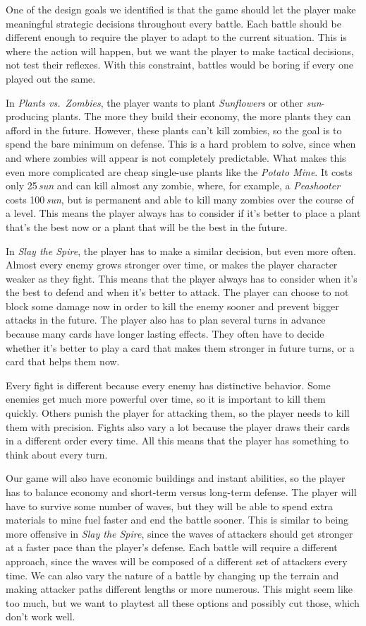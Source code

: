 One of the design goals we identified is that the game should let the player make meaningful strategic decisions throughout every battle.
Each battle should be different enough to require the player to adapt to the current situation.
This is where the action will happen, but we want the player to make tactical decisions, not test their reflexes.
With this constraint, battles would be boring if every one played out the same.

In \emph{Plants vs.\ Zombies}, the player wants to plant \emph{Sunflowers} or other \emph{sun}-producing plants.
The more they build their economy, the more plants they can afford in the future.
However, these plants can't kill zombies, so the goal is to spend the bare minimum on defense.
This is a hard problem to solve, since when and where zombies will appear is not completely predictable.
What makes this even more complicated are cheap single-use plants like the \emph{Potato Mine}.
It costs only 25\,\emph{sun} and can kill almost any zombie, where, for example, a \emph{Peashooter} costs 100\,\emph{sun}, but is permanent and able to kill many zombies over the course of a level.
This means the player always has to consider if it's better to place a plant that's the best now or a plant that will be the best in the future.

In \emph{Slay the Spire}, the player has to make a similar decision, but even more often.
Almost every enemy grows stronger over time, or makes the player character weaker as they fight.
This means that the player always has to consider when it's the best to defend and when it's better to attack.
The player can choose to not block some damage now in order to kill the enemy sooner and prevent bigger attacks in the future.
The player also has to plan several turns in advance because many cards have longer lasting effects.
They often have to decide whether it's better to play a card that makes them stronger in future turns, or a card that helps them now.

Every fight is different because every enemy has distinctive behavior.
Some enemies get much more powerful over time, so it is important to kill them quickly.
Others punish the player for attacking them, so the player needs to kill them with precision.
Fights also vary a lot because the player draws their cards in a different order every time.
All this means that the player has something to think about every turn.

Our game will also have economic buildings and instant abilities, so the player has to balance economy and short-term versus long-term defense.
The player will have to survive some number of waves, but they will be able to spend extra materials to mine fuel faster and end the battle sooner.
This is similar to being more offensive in \emph{Slay the Spire}, since the waves of attackers should get stronger at a faster pace than the player's defense.
Each battle will require a different approach, since the waves will be composed of a different set of attackers every time.
We can also vary the nature of a battle by changing up the terrain and making attacker paths different lengths or more numerous.
This might seem like too much, but we want to playtest all these options and possibly cut those, which don't work well.

